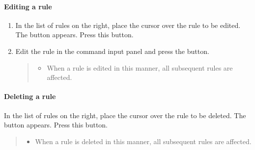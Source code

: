 \documentclass[letterpaper,10pt,english]{sphinxmanual}
\begin{document}
\paragraph{Editing a rule}
\label{\detokenize{discovery/part07/edit_rules:id7}}\begin{enumerate}
\def\theenumi{\arabic{enumi}}
\def\labelenumi{\theenumi .}
\makeatletter\def\p@enumii{\p@enumi \theenumi .}\makeatother
\item {} 
In the list of rules on the right, place the cursor over the rule to be edited. The  button appears. Press this button.
\begin{quote}

\begin{figure}[H]
\centering

\noindent{}
\end{figure}
\end{quote}

\item {} 
Edit the rule in the command input panel and press the  button.
\begin{quote}
\begin{itemize}
\item {} 
When a rule is edited in this manner, all subsequent rules are affected.

\end{itemize}

\begin{figure}[H]
\centering

\noindent{}
\end{figure}
\end{quote}

\end{enumerate}


\paragraph{Deleting a rule}
\label{\detokenize{discovery/part07/edit_rules:id8}}
In the list of rules on the right, place the cursor over the rule to be deleted. The  button appears. Press this button.
\begin{quote}
\begin{itemize}
\item {} 
When a rule is deleted in this manner, all subsequent rules are affected.

\end{itemize}

\begin{figure}[H]
\centering

\noindent{}
\end{figure}
\end{quote}
\end{document}
